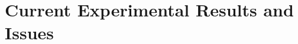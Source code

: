 \documentclass[a4paper, 11pt]{article}
\begin{document}
\begin{sloppypar}
\section{Current Experimental Results and Issues}\label{s:2}



\end{sloppypar}
\end{document}

